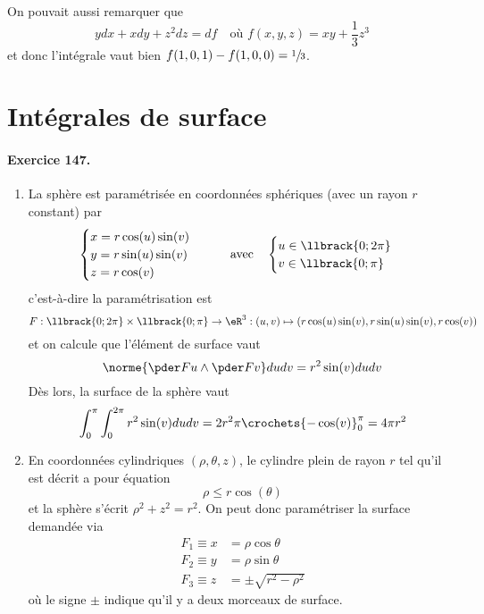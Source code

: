 On pouvait aussi remarquer que
\begin{equation*}
y d x + x d y + z^2 d z = d f \quad\text{où }f(x,y,z) = xy + \frac13 z^3
\end{equation*}
et donc l'intégrale vaut bien $f(1,0,1) - f(1,0,0) = \sfrac13$.

\section{Intégrales de surface}





\paragraph{Exercice 147.}
\begin{enumerate}
\item La sphère est paramétrisée en coordonnées sphériques (avec un
rayon $r$ constant) par
\begin{equation*}
\begin{cases}
x = r \cos(u)\sin(v)\\
y = r \sin(u)\sin(v)\\
z = r \cos(v)
\end{cases}\qquad\text{avec}\quad
\begin{cases}
u \in \llbrack{0;2\pi}\\
v \in \llbrack{0;\pi}
\end{cases}
\end{equation*}
c'est-à-dire la paramétrisation est
\begin{equation*}
F : \llbrack{0;2\pi} \times \llbrack{0;\pi} \to \eR^3 : (u,v)
\mapsto (r \cos(u)\sin(v), r\sin(u)\sin(v), r\cos(v))
\end{equation*}
et on calcule que l'élément de surface vaut
\begin{equation*}
\norme{\pder F u \wedge \pder F v} d u d v = r^2 \sin (v) d u d v
\end{equation*}
Dès lors, la surface de la sphère vaut
\begin{equation*}
\int_0^\pi \int_0^{2\pi} r^2 \sin(v) d u d v = 2r^2 \pi \crochets{-\cos(v)}_0^\pi = 4 \pi r^2
\end{equation*}

\item En coordonnées cylindriques $(\rho,\theta,z)$, le cylindre plein
de rayon $r$ tel qu'il est décrit a pour équation
\begin{equation*}
\rho \leq r \cos(\theta)
\end{equation*}
et la sphère s'écrit $\rho^2 + z^2 = r^2$. On peut donc paramétriser
la surface demandée via
\begin{equation*}
\begin{split}
F_1 \equiv x &= \rho \cos \theta\\
F_2 \equiv y &= \rho \sin \theta\\
F_3 \equiv z &= \pm \sqrt{r^2 - \rho^2}
\end{split}
\end{equation*}
où le signe $\pm$ indique qu'il y a deux morceaux de surface.


\end{enumerate}
